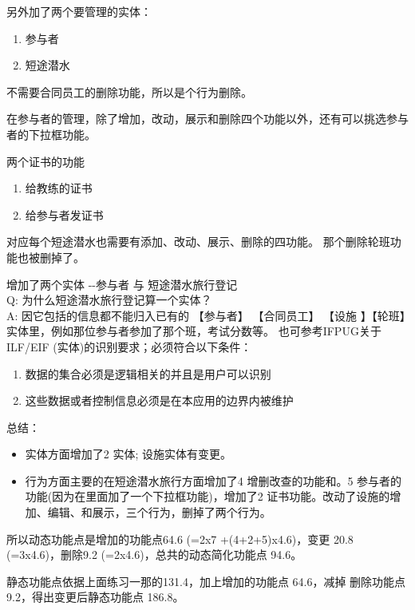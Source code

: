 另外加了两个要管理的实体：

\begin{enumerate}
\tightlist
\item
  参与者
\item
  短途潜水
\end{enumerate}

不需要合同员工的删除功能，所以是个行为删除。

在参与者的管理，除了增加，改动，展示和删除四个功能以外，还有可以挑选参与者的下拉框功能。

两个证书的功能

\begin{enumerate}
\tightlist
\item
  给教练的证书
\item
  给参与者发证书
\end{enumerate}

对应每个短途潜水也需要有添加、改动、展示、删除的四功能。
那个删除轮班功能也被删掉了。

增加了两个实体 -\/-参与者 与 短途潜水旅行登记\\
Q: 为什么短途潜水旅行登记算一个实体？\\
A: 因它包括的信息都不能归入已有的 【参与者】 【合同员工】 【设施
】【轮班】实体里，例如那位参与者参加了那个班，考试分数等。
也可参考IFPUG关于ILF/EIF (实体)的识别要求；必须符合以下条件：

\begin{enumerate}
\tightlist
\item
  数据的集合必须是逻辑相关的并且是用户可以识别
\item
  这些数据或者控制信息必须是在本应用的边界内被维护
\end{enumerate}

总结：

\begin{itemize}
\tightlist
\item
  实体方面增加了2 实体; 设施实体有变更。
\item
  行为方面主要的在短途潜水旅行方面增加了4 增删改查的功能和。5
  参与者的功能(因为在里面加了一个下拉框功能)，增加了2
  证书功能。改动了设施的增加、编辑、和展示，三个行为，删掉了两个行为。
\end{itemize}

所以动态功能点是增加的功能点64.6 (=2x7 +(4+2+5)x4.6)，变更 20.8
(=3x4.6)，删除9.2 (=2x4.6)，总共的动态简化功能点 94.6。

静态功能点依据上面练习一那的131.4，加上增加的功能点 64.6，减掉
删除功能点 9.2，得出变更后静态功能点 186.8。

